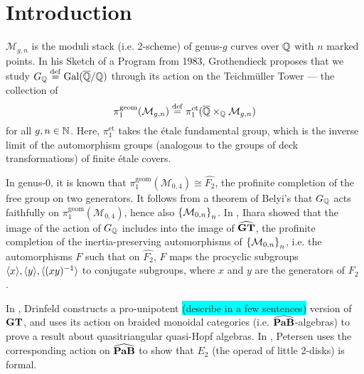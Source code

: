 \chapter{Introduction}
$\mathcal{M}_{g,n}$ is the moduli stack (i.e. 2-scheme) of genus-$g$ curves over $\mathbb{Q}$ with $n$ marked points. In his Sketch of a Program \cite{Grothendieck_1997} from 1983, Grothendieck proposes that we study $G_{\mathbb{Q}}\overset{\mathrm{def}}{=}\mathrm{Gal}(\overline{\mathbb{Q}}/\mathbb{Q})$ through its action on the Teichm\"uller Tower --- the collection of
\[\pi^{\mathrm{geom}}_1(\mathcal{M}_{g,n})\overset{\mathrm{def}}{=}\pi_1^{\mathrm{et}}(\overline{\mathbb{Q}}\times_{\mathbb{Q}}\mathcal{M}_{g,n})\]
for all $g,n\in\mathbb{N}$. Here, $\pi_1^{\mathrm{et}}$ takes the \'etale fundamental group, which is the inverse limit of the automorphism groups (analogous to the groups of deck transformations) of finite \'etale covers.

In genus-0, it is known that $\pi^{\mathrm{geom}}_1(\mathcal{M}_{0,4})\cong\widehat{F_2}$, the profinite completion of the free group on two generators. It follows from a theorem of Belyi's \cite{Belyĭ_1980} that $G_{\mathbb{Q}}$ acts faithfully on $\pi^{\mathrm{geom}}_1(\mathcal{M}_{0,4})$, hence also $\left\{\mathcal{M}_{0,n}\right\}_n$. In \cite{Ihara_1991}, Ihara showed that the image of the action of $G_{\mathbb{Q}}$ includes into the image of $\widehat{\mathbf{GT}}$, the profinite completion of the inertia-preserving automorphisms of $\left\{\mathcal{M}_{0,n}\right\}_n$, i.e. the automorphisms $F$ such that on $\widehat{F_2}$, $F$ maps the procyclic subgroups $\langle x\rangle,\langle y\rangle,\langle(xy)^{-1}\rangle$ to conjugate subgroups, where $x$ and $y$ are the generators of $F_2$ \cite{Lochak}.

In \cite{Drinfeld_1991}, Drinfeld constructs a pro-unipotent \colorbox{cyan}{(describe in a few sentences)} version of $\mathbf{GT}$, and uses its action on braided monoidal categories (i.e. $\widehat{\mathbf{PaB}}$-algebras) to prove a result about quasitriangular quasi-Hopf algebras. In \cite{Petersen_2014}, Petersen uses the corresponding action on $\widehat{\mathbf{PaB}}$ to show that $E_2$ (the operad of little 2-disks) is formal.